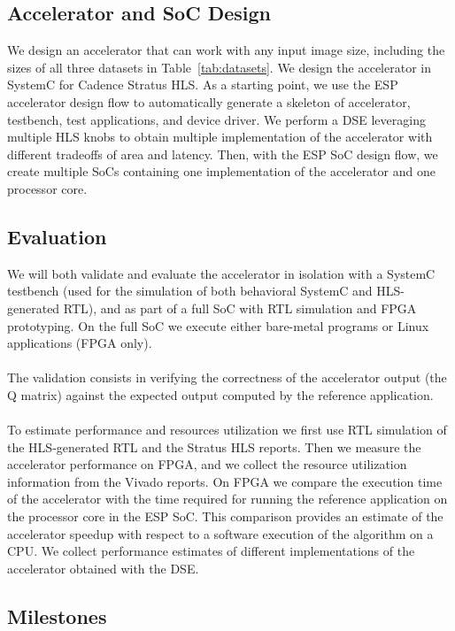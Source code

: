 \subsection{Accelerator and SoC Design}

We design an accelerator that can work with any input image size, including the
sizes of all three datasets in Table~\ref{tab:datasets}. We design the
accelerator in SystemC for Cadence Stratus HLS. As a starting point, we use the
ESP accelerator design flow to automatically generate a skeleton of accelerator,
testbench, test applications, and device driver.
%
We perform a DSE leveraging multiple HLS knobs to obtain
multiple implementation of the accelerator with different tradeoffs of area and
latency.
%
Then, with the ESP SoC design flow, we create multiple SoCs containing one
implementation of the accelerator and one processor core.

\subsection{Evaluation}

We will both validate and evaluate the accelerator in isolation with a SystemC
testbench (used for the simulation of both behavioral SystemC and HLS-generated
RTL), and as part of a full SoC with RTL simulation and FPGA prototyping. On the
full SoC we execute either bare-metal programs or Linux applications (FPGA
only).\\
\\
The validation consists in verifying the correctness of the
accelerator output (the Q matrix) against the expected output computed by the
reference application.\\
\\
To estimate performance and resources utilization we first use RTL simulation of
the HLS-generated RTL and the Stratus HLS reports. Then we measure the
accelerator performance on FPGA, and we collect the resource utilization
information from the Vivado reports. On FPGA we compare the execution time of
the accelerator with the time required for running the reference application on
the processor core in the ESP SoC. This comparison provides an estimate of the
accelerator speedup with respect to a software execution of the algorithm on a
CPU.
%
We collect performance estimates of different implementations of the
accelerator obtained with the DSE.

\subsection{Milestones}
\label{sec:milestones}

